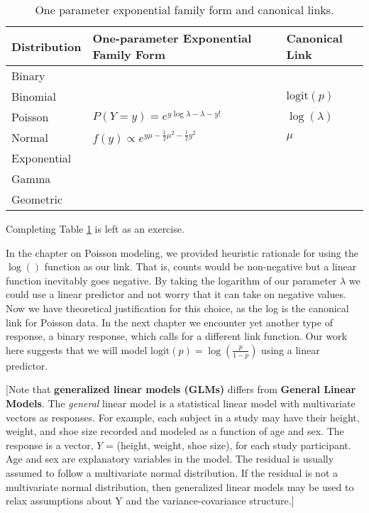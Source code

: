 \documentclass[
]{krantz}
\begin{document}
\begin{table}

\caption{\label{tab:table1chp5}One parameter exponential family form and canonical links.}
\centering
\begin{tabular}[t]{lll}
\toprule
Distribution & One-parameter Exponential Family Form & Canonical Link\\
\midrule
Binary &  & \\
Binomial &  & $\text{logit}(p)$\\
Poisson & $P(Y=y) = e^{y\log\lambda - \lambda - y!}$ & $\log(\lambda)$\\
Normal & $f(y) \propto e^{y\mu -\frac{1}{2}\mu^2 -\frac{1}{2}y^2}$ & $\mu$\\
Exponential &  & \\
\addlinespace
Gamma &  & \\
Geometric &  & \\
\bottomrule
\end{tabular}
\end{table}

Completing Table \ref{tab:table1chp5} is left as an exercise.

In the chapter on Poisson modeling, we provided heuristic rationale for using the \(\log()\) function as our link. That is, counts would be non-negative but a linear function inevitably goes negative. By taking the logarithm of our parameter \(\lambda\) we could use a linear predictor and not worry that it can take on negative values. Now we have theoretical justification for this choice, as the log is the canonical link for Poisson data. In the next chapter we encounter yet another type of response, a binary response, which calls for a different link function. Our work here suggests that we will model \(\text{logit}(p)=\log\left(\frac{p}{1-p}\right)\) using a linear predictor.

{[}Note that \textbf{generalized linear models (GLMs)} differs from \textbf{General Linear Models}. The \emph{general} linear model is a statistical linear model with multivariate vectors as responses. For example, each subject in a study may have their height, weight, and shoe size recorded and modeled as a function of age and sex. The response is a vector, \(Y\) = (height, weight, shoe size), for each study participant. Age and sex are explanatory variables in the model. The residual is usually assumed to follow a multivariate normal distribution. If the residual is not a multivariate normal distribution, then generalized linear models may be used to relax assumptions about Y and the variance-covariance structure.{]}
\end{document}

